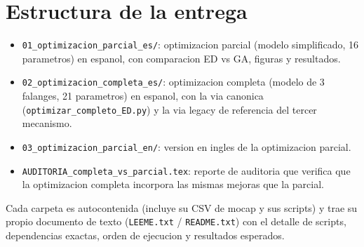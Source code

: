 \documentclass[11pt,a4paper]{article}
\begin{document}
\section{Estructura de la entrega}

\begin{itemize}[leftmargin=1.4em]
  \item \texttt{01\_optimizacion\_parcial\_es/}: optimizacion parcial (modelo
        simplificado, 16 parametros) en espanol, con comparacion ED vs GA,
        figuras y resultados.
  \item \texttt{02\_optimizacion\_completa\_es/}: optimizacion completa (modelo de
        3 falanges, 21 parametros) en espanol, con la via canonica
        (\texttt{optimizar\_completo\_ED.py}) y la via legacy de referencia del
        tercer mecanismo.
  \item \texttt{03\_optimizacion\_parcial\_en/}: version en ingles de la
        optimizacion parcial.
  \item \texttt{AUDITORIA\_completa\_vs\_parcial.tex}: reporte de auditoria que
        verifica que la optimizacion completa incorpora las mismas mejoras que la
        parcial.
\end{itemize}

Cada carpeta es autocontenida (incluye su CSV de mocap y sus scripts) y trae su
propio documento de texto (\texttt{LEEME.txt} / \texttt{README.txt}) con el
detalle de scripts, dependencias exactas, orden de ejecucion y resultados
esperados.
\end{document}
